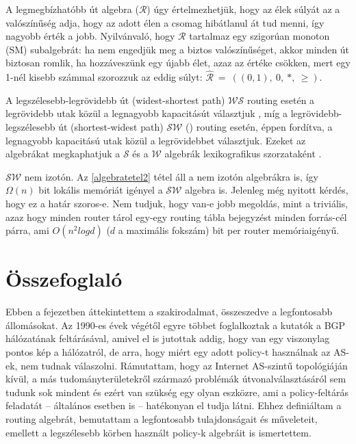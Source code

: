   A legmegbízhatóbb út algebra ($\mathcal{R}$) úgy értelmezhetjük, hogy az élek súlyát az a valószínűség adja, hogy az adott élen a csomag hibátlanul át tud menni, így nagyobb érték a jobb. Nyilvánvaló, hogy $\mathcal{R}$ tartalmaz egy szigorúan monoton (SM) subalgebrát: ha nem engedjük meg a biztos valószínűséget, akkor minden út biztosan romlik, ha hozzáveszünk egy újabb élet, azaz az értéke csökken, mert egy 1-nél kisebb számmal szorozzuk az eddig súlyt: $\hat{\mathcal{R}}~=~((0,1),~0,~*,~\geq)$.

  A legszélesebb-legrövidebb út (widest-shortest path) $\mathcal{WS}$ routing esetén a legrövidebb utak közül a legnagyobb kapacitásút választjuk \cite{Quality_of_service_based_routing_A_performance_perspective}, míg a legrövidebb-legszélesebb út (shortest-widest path) $\mathcal{SW}$ (\cite{Quality_of_service_routing_for_supporting_multimedia_applications, On_path_selection_for_traffic_with_bandwidth_guarantees}) routing esetén, éppen fordítva, a legnagyobb kapacitású utak közül a legrövidebbet választjuk. Ezeket az algebrákat megkaphatjuk a $\mathcal{S}$ és a $\mathcal{W}$ algebrák lexikografikus szorzataként \cite{Lexicographic_products_in_metarouting}.
  \begin{note}
    $\mathcal{SW}$ nem izotón. Az \eqref{algebratetel2} tétel áll a nem izotón algebrákra is, így $\Omega(n)$ bit lokális memóriát igényel a $\mathcal{SW}$ algebra is. Jelenleg még nyitott kérdés, hogy ez a határ szoros-e. Nem tudjuk, hogy van-e jobb megoldás, mint a triviális, azaz hogy minden router tárol egy-egy routing tábla bejegyzést minden forrás-cél párra, ami $O(n^2 log d)$ ($d$ a maximális fokszám) bit per router memóriaigényű.
  \end{note}

  \section{Összefoglaló}\label{section_osszefoglalo1}

  Ebben a fejezetben áttekintettem a szakirodalmat, összeszedve a legfontosabb állomásokat. Az 1990-es évek végétől egyre többet foglalkoztak a kutatók a BGP hálózatának feltárásával, amivel el is jutottak addig, hogy van egy viszonylag pontos kép a hálózatról, de arra, hogy miért egy adott policy-t használnak az AS-ek, nem tudnak válaszolni. Rámutattam, hogy az Internet AS-szintű topológiáján kívül, a más tudományterületekről származó problémák útvonalválasztásáról sem tudunk sok mindent és ezért van szükség egy olyan eszközre, ami a policy-feltárás feladatát -- általános esetben is -- hatékonyan el tudja látni. Ehhez definiáltam a routing algebrát, bemutattam a legfontosabb tulajdonságait és műveleteit, emellett a legszélesebb körben használt policy-k algebráit is ismertettem.
